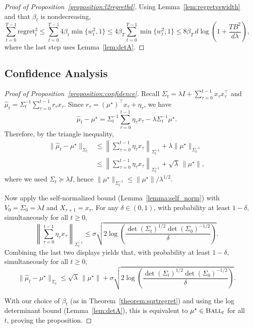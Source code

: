 \begin{proof}[Proof of Proposition~\ref{proposition:l2regretbd}]
Using Lemma~\ref{lem:regretvswidth} and that $\beta_t$ is nondecreasing,
\[
\sum_{t=0}^{T-1}\mathrm{regret}_t^2
\le
\sum_{t=0}^{T-1} 4\beta_t \min\{w_t^2,1\}
\le
4\beta_T \sum_{t=0}^{T-1}\min\{w_t^2,1\}
\le
8\beta_T\, d\log\!\left(1+\frac{TB^2}{d\lambda}\right),
\]
where the last step uses Lemma~\ref{lem:detA}.
\end{proof}

\subsection{Confidence Analysis}\label{sec:confidence}

\begin{proof}[Proof of Proposition~\ref{proposition:confidence}]
Recall $\Sigma_t=\lambda I+\sum_{\tau=0}^{t-1}x_\tau x_\tau^\top$ and
$\widehat{\mu}_t=\Sigma_t^{-1}\sum_{\tau=0}^{t-1} r_\tau x_\tau$.
Since $r_\tau = (\mu^\star)^\top x_\tau + \eta_\tau$, we have
\[
\widehat{\mu}_t-\mu^\star
=
\Sigma_t^{-1}\sum_{\tau=0}^{t-1}\eta_\tau x_\tau
-\lambda \Sigma_t^{-1}\mu^\star.
\]
Therefore, by the triangle inequality,
\begin{align*}
\|\widehat{\mu}_t-\mu^\star\|_{\Sigma_t}
&\le
\left\|\sum_{\tau=0}^{t-1}\eta_\tau x_\tau\right\|_{\Sigma_t^{-1}}
+
\lambda\|\mu^\star\|_{\Sigma_t^{-1}} \\
&\le
\left\|\sum_{\tau=0}^{t-1}\eta_\tau x_\tau\right\|_{\Sigma_t^{-1}}
+
\sqrt{\lambda}\,\|\mu^\star\|,
\end{align*}
where we used $\Sigma_t\succeq \lambda I$, hence
$\|\mu^\star\|_{\Sigma_t^{-1}}\le \|\mu^\star\|/\lambda^{1/2}$.

Now apply the self-normalized bound (Lemma~\ref{lemma:self_norm}) with
$V_0=\Sigma_0=\lambda I$ and $X_{\tau+1}=x_\tau$.
For any $\delta \in (0,1)$, with probability at least $1-\delta$, simultaneously for all $t \ge 0$,
\[
\left\|\sum_{\tau=0}^{t-1}\eta_\tau x_\tau\right\|_{\Sigma_t^{-1}}
\le
\sigma\sqrt{2\log\!\left(\frac{\det(\Sigma_t)^{1/2}\det(\Sigma_0)^{-1/2}}{\delta}\right)}.
\]
Combining the last two displays yields that, with probability at least $1-\delta$, simultaneously for all $t \ge 0$,
\[
\|\widehat{\mu}_t-\mu^\star\|_{\Sigma_t}
\le
\sqrt{\lambda}\,\|\mu^\star\|
+
\sigma\sqrt{2\log\!\left(\frac{\det(\Sigma_t)^{1/2}\det(\Sigma_0)^{-1/2}}{\delta}\right)}.
\]

With our choice of $\beta_t$ (as in Theorem~\ref{theorem:sqrtregret})
and using the log determinant bound (Lemma~\ref{lem:detA}), this is
equivalent to $\mu^\star\in \textsc{Ball}_t$ for all $t$, proving the proposition.
\end{proof}

